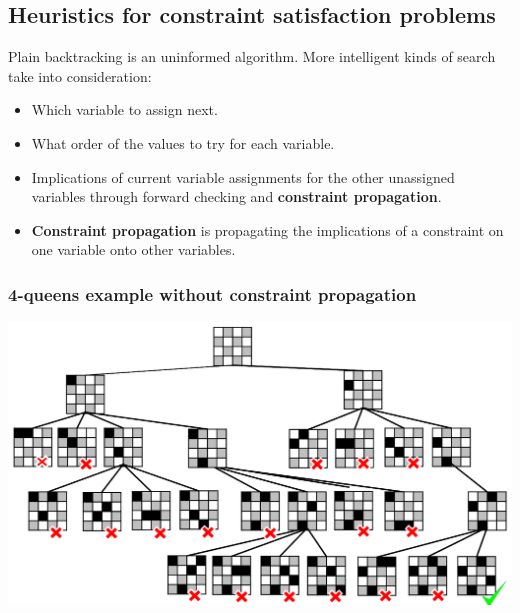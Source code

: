 \documentclass[11pt]{article}
\begin{document}
\subsection{Heuristics for constraint satisfaction problems}
\label{sec:orge8a821c}
Plain backtracking is an uninformed algorithm. More intelligent kinds of search take into consideration:
\begin{itemize}
\item Which variable to assign next.
\item What order of the values to try for each variable.
\item Implications of current variable assignments for the other unassigned variables through forward checking and \textbf{constraint propagation}.
\item \textbf{Constraint propagation} is propagating the implications of a constraint on one variable onto other variables.
\end{itemize}
\subsubsection{4-queens example without constraint propagation}
\label{sec:orgc50ef87}
\begin{center}
\includegraphics[width=.9\linewidth]{./images/4-queens-example.png}
\end{center}
\end{document}
